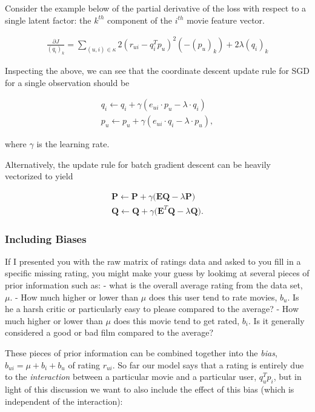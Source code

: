 \documentclass[11pt]{article}
\begin{document}
    Consider the example below of the partial derivative of the loss with
respect to a single latent factor: the \(k^{th}\) component of the
\(i^{th}\) movie feature vector.

\begin{align*}
\frac{\partial J}{(q_i)_k} = \sum_{(u,i)\in\kappa} 2(r_{ui} - q_i^Tp_u)^2(-(p_u)_k) + 2\lambda(q_i)_k
\end{align*}

Inspecting the above, we can see that the coordinate descent update rule
for SGD for a single observation should be

\begin{align*}
q_i \leftarrow q_i + \gamma(e_{ui}\cdot p_u - \lambda\cdot q_i)\\
p_u \leftarrow p_u + \gamma(e_{ui}\cdot q_i - \lambda\cdot p_u),
\end{align*}

where \(\gamma\) is the learning rate.

Alternatively, the update rule for batch gradient descent can be heavily
vectorized to yield

\begin{align*}
\mathbf{P} \leftarrow \mathbf{P} + \gamma\big(\mathbf{E}\mathbf{Q} - \lambda\mathbf{P}\big)\\
\mathbf{Q} \leftarrow \mathbf{Q} + \gamma\big(\mathbf{E}^T\mathbf{Q} - \lambda\mathbf{Q}\big).
\end{align*}

    \subsubsection{Including Biases}\label{including-biases}

If I presented you with the raw matrix of ratings data and asked to you
fill in a specific missing rating, you might make your guess by lookimg
at several pieces of prior information such as: - what is the overall
average rating from the data set, \(\mu\). - How much higher or lower
than \(\mu\) does this user tend to rate movies, \(b_u\). Is he a harsh
critic or particularly easy to please compared to the average? - How
much higher or lower than \(\mu\) does this movie tend to get rated,
\(b_i\). Is it generally considered a good or bad film compared to the
average?

These pieces of prior information can be combined together into the
\emph{bias}, \(b_{ui} = \mu + b_i + b_u\) of rating \(r_{ui}\). So far
our model says that a rating is entirely due to the \emph{interaction}
between a particular movie and a particular user, \(q_u^Tp_i\), but in
light of this discussion we want to also include the effect of this bias
(which is independent of the interaction):
\end{document}
